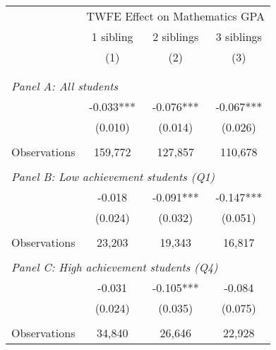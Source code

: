 \makeatletter
{}
{
\makeatother
\begin{tabular}{lccc}
\toprule
\cmidrule(lr){2-4}
& \multicolumn{3}{c}{TWFE Effect on Mathematics GPA} \\
\cmidrule(lr){2-4}
& 1 sibling & 2 siblings & 3 siblings  \\
\cmidrule(lr){2-2} \cmidrule(lr){3-3} \cmidrule(lr){4-4}
& (1) & (2) & (3)\\
\bottomrule
&  &  &  \\
&  &  &   \\
\multicolumn{4}{l}{\textit{Panel A: All students}} \\
\hspace{3mm}        &      -0.033***&      -0.076***&      -0.067***\\
                    &     (0.010)   &     (0.014)   &     (0.026)   \\
                    &               &               &               \\
\hspace{3mm}Observations&     159,772   &     127,857   &     110,678   \\
 
&  &  &   \\
\multicolumn{4}{l}{\textit{Panel B: Low achievement students (Q1)}} \\
\hspace{3mm}        &      -0.018   &      -0.091***&      -0.147***\\
                    &     (0.024)   &     (0.032)   &     (0.051)   \\
                    &               &               &               \\
\hspace{3mm}Observations&      23,203   &      19,343   &      16,817   \\
 
&  &  &   \\
\multicolumn{4}{l}{\textit{Panel C: High achievement students (Q4)}} \\
\hspace{3mm}        &      -0.031   &      -0.105***&      -0.084   \\
                    &     (0.024)   &     (0.035)   &     (0.075)   \\
                    &               &               &               \\
\hspace{3mm}Observations&      34,840   &      26,646   &      22,928   \\
 

\end{tabular}}
